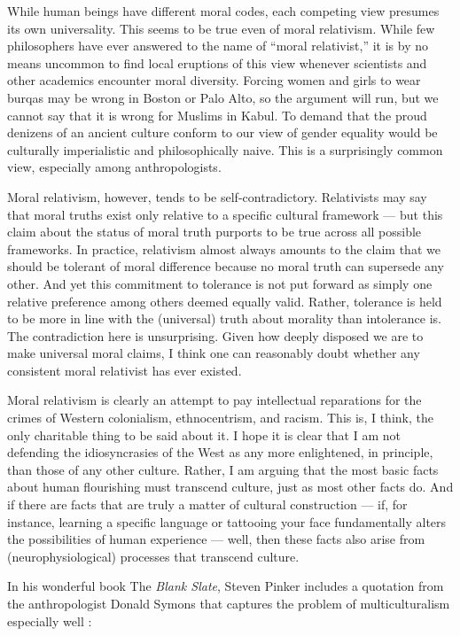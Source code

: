 \documentclass[a4paper,14pt]{extarticle}
\begin{document}
While human beings have different moral codes, each competing view presumes its own universality.
This seems to be true even of moral relativism.
While few philosophers have ever answered to the name of ``moral relativist,'' it is by no means uncommon to find local eruptions of this view whenever scientists and other academics encounter moral diversity.
Forcing women and girls to wear burqas may be wrong in Boston or Palo Alto, so the argument will run, but we cannot say that it is wrong for Muslims in Kabul.
To demand that the proud denizens of an ancient culture conform to our view of gender equality would be culturally imperialistic and philosophically naive.
This is a surprisingly common view, especially among anthropologists.

Moral relativism, however, tends to be self-contradictory.
Relativists may say that moral truths exist only relative to a specific cultural framework --- but this claim about the status of moral truth purports to be true across all possible frameworks.
In practice, relativism almost always amounts to the claim that we should be tolerant of moral difference because no moral truth can supersede any other.
And yet this commitment to tolerance is not put forward as simply one relative preference among others deemed equally valid.
Rather, tolerance is held to be more in line with the (universal) truth about morality than intolerance is.
The contradiction here is unsurprising.
Given how deeply disposed we are to make universal moral claims, I think one can reasonably doubt whether any consistent moral relativist has ever existed.

Moral relativism is clearly an attempt to pay intellectual reparations for the crimes of Western colonialism, ethnocentrism, and racism.
This is, I think, the only charitable thing to be said about it.
I hope it is clear that I am not defending the idiosyncrasies of the West as any more enlightened, in principle, than those of any other culture.
Rather, I am arguing that the most basic facts about human flourishing must transcend culture, just as most other facts do.
And if there are facts that are truly a matter of cultural construction --- if, for instance, learning a specific language or tattooing your face fundamentally alters the possibilities of human experience --- well, then these facts also arise from (neurophysiological) processes that transcend culture.

In his wonderful book The \textit{Blank Slate}, Steven Pinker includes a quotation from the anthropologist Donald Symons that captures the problem of multiculturalism especially well :
\end{document}
